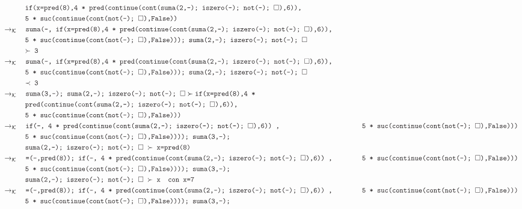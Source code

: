 \documentclass{article}
\newcommand{\tx}[1]{\textcolor{Black} {\texttt{#1}}}
\newcommand{\es}{$\square$}
\newcommand{\pop}[2]{ \tx{#1} \succ \tx{#2}}
\newcommand{\kr}{\rightarrow_{\mathcal{K}} \quad}
\begin{document}
\begin{enumerate}
\begin{enumerate}
\begin{align*}
			&\tx{\quad \quad \quad if(x=pred(8),4 * pred(continue(cont(suma(2,-); iszero(-); not(-); \es),6)),}\\
			&\tx{\quad \quad \quad 5 * suc(continue(cont(not(-); \es),False))}\\
			& \kr \tx{suma(-, if(x=pred(8),4 * pred(continue(cont(suma(2,-); iszero(-); not(-); \es),6)),}\\
			&\tx{\quad \quad \quad5 * suc(continue(cont(not(-); \es),False))); suma(2,-); iszero(-); not(-); \es}\\
			&\tx{\quad \quad \quad $\succ$ 3}\\
			& \kr \tx{suma(-, if(x=pred(8),4 * pred(continue(cont(suma(2,-); iszero(-); not(-); \es),6)),}\\
			&\tx{\quad \quad \quad5 * suc(continue(cont(not(-); \es),False))); suma(2,-); iszero(-); not(-); \es}\\
			&\tx{\quad \quad \quad $\prec$ 3}\\
			&\kr \pop{suma(3,-); suma(2,-); iszero(-); not(-); \es}{if(x=pred(8),4 *}\\
			&\tx{\quad \quad \quad pred(continue(cont(suma(2,-); iszero(-); not(-); \es),6)),}\\
			&\tx{\quad \quad \quad 5 * suc(continue(cont(not(-); \es),False)))}\\
			&\kr \tx{if(-, 4 * pred(continue(cont(suma(2,-); iszero(-); not(-); \es),6)) ,}
			&\tx{\quad \quad \quad 5 * suc(continue(cont(not(-); \es),False)))}\\
			&\tx {\quad \quad \quad 5 * suc(continue(cont(not(-); \es),False)))); suma(3,-);}\\
			&\tx{\quad \quad \quad suma(2,-); iszero(-); not(-); \es $\ \succ $ x=pred(8)}\\
			&\kr \tx{=(-,pred(8)); if(-, 4 * pred(continue(cont(suma(2,-); iszero(-); not(-); \es),6)) ,}
			&\tx{\quad \quad \quad 5 * suc(continue(cont(not(-); \es),False)))}\\
			&\tx {\quad \quad \quad 5 * suc(continue(cont(not(-); \es),False)))); suma(3,-);}\\
			&\tx{\quad \quad \quad suma(2,-); iszero(-); not(-); \es $\ \succ $ x} \tx{\quad con x=7}\\	
			&\kr \tx{=(-,pred(8)); if(-, 4 * pred(continue(cont(suma(2,-); iszero(-); not(-); \es),6)) ,}
			&\tx{\quad \quad \quad 5 * suc(continue(cont(not(-); \es),False)))}\\
			&\tx {\quad \quad \quad 5 * suc(continue(cont(not(-); \es),False)))); suma(3,-);}\\

\end{align*}
\end{enumerate}
\end{enumerate}
\end{document}
